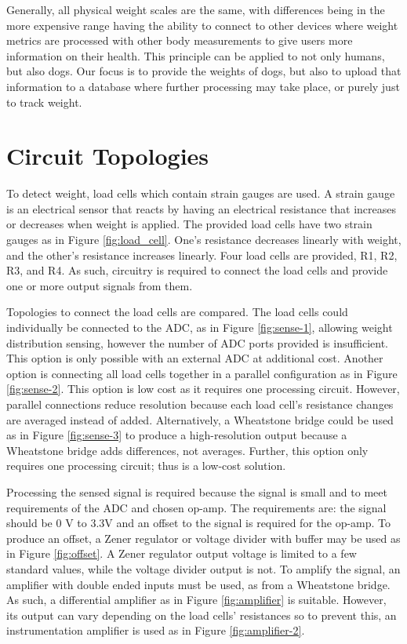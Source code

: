 Generally, all physical weight scales are the same, with differences being in the more expensive range having the ability to connect to other devices where weight metrics are processed with other body measurements to give users more information on their health. This principle can be applied to not only humans, but also dogs. Our focus is to provide the weights of dogs, but also to upload that information to a database where further processing may take place, or purely just to track weight.



\section{Circuit Topologies}


To detect weight, load cells which contain strain gauges are used. A strain gauge is an electrical sensor that reacts by having an electrical resistance that increases or decreases when weight is applied. The provided load cells have two strain gauges as in Figure \ref{fig:load_cell}. One’s resistance decreases linearly with weight, and the other’s resistance increases linearly. Four load cells are provided, R1, R2, R3, and R4. As such, circuitry is required to connect the load cells and provide one or more output signals from them.


Topologies to connect the load cells are compared. The load cells could individually be connected to the ADC, as in Figure \ref{fig:sense-1}, allowing weight distribution sensing, however the number of ADC ports provided is insufficient. This option is only possible with an external ADC at additional cost. Another option is connecting all load cells together in a parallel configuration as in Figure \ref{fig:sense-2}. This option is low cost as it requires one processing circuit. However, parallel connections reduce resolution because each load cell's resistance changes are averaged instead of added. Alternatively, a Wheatstone bridge could be used as in Figure \ref{fig:sense-3} to produce a high-resolution output because a Wheatstone bridge adds differences, not averages. Further, this option only requires one processing circuit; thus is a low-cost solution.



Processing the sensed signal is required because the signal is small and to meet requirements of the ADC and chosen op-amp. The requirements are: the signal should be 0 V to 3.3V and an offset to the signal is required for the op-amp. To produce an offset, a Zener regulator or voltage divider with buffer may be used as in Figure \ref{fig:offset}. A Zener regulator output voltage is limited to a few standard values, while the voltage divider output is not. To amplify the signal, an amplifier with double ended inputs must be used, as from a Wheatstone bridge. As such, a differential amplifier as in Figure \ref{fig:amplifier} is suitable. However, its output can vary depending on the load cells' resistances so to prevent this, an instrumentation amplifier is used as in Figure \ref{fig:amplifier-2}.






